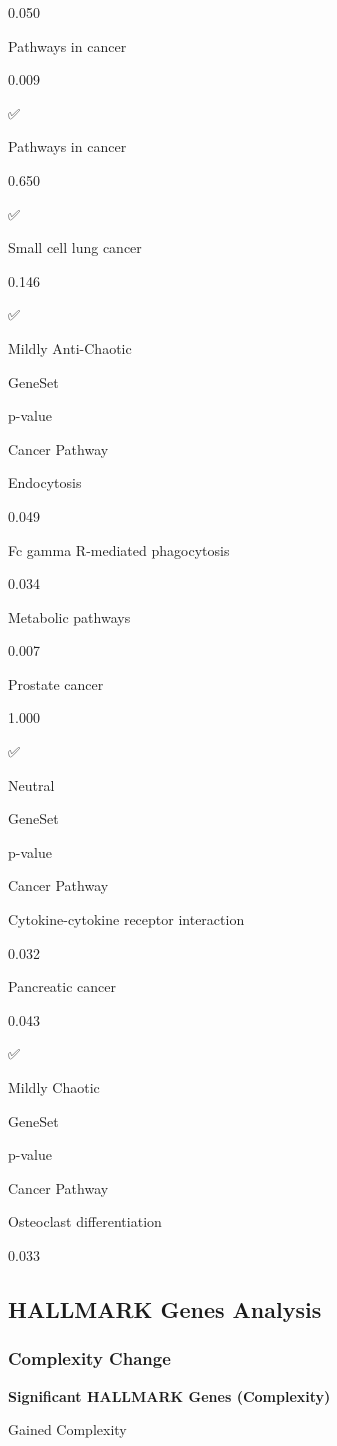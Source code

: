 \documentclass[
  letterpaper,
  DIV=11,
  numbers=noendperiod,
  openany,
  oneside]{scrreprt}
\begin{document}
0.050

Pathways in cancer

0.009

✅

Pathways in cancer

0.650

✅

Small cell lung cancer

0.146

✅

Mildly Anti-Chaotic

GeneSet

p-value

Cancer Pathway

Endocytosis

0.049

Fc gamma R-mediated phagocytosis

0.034

Metabolic pathways

0.007

Prostate cancer

1.000

✅

Neutral

GeneSet

p-value

Cancer Pathway

Cytokine-cytokine receptor interaction

0.032

Pancreatic cancer

0.043

✅

Mildly Chaotic

GeneSet

p-value

Cancer Pathway

Osteoclast differentiation

0.033

\subsection{HALLMARK Genes Analysis}

\subsubsection{Complexity Change}

\textbf{Significant HALLMARK Genes (Complexity)}

Gained Complexity
\end{document}
